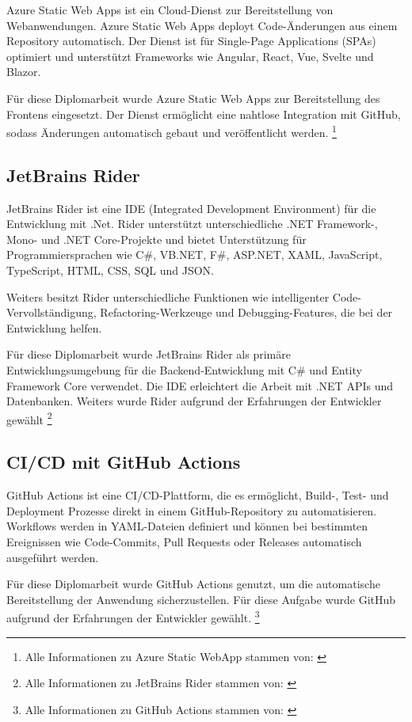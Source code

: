 Azure Static Web Apps ist ein Cloud-Dienst zur Bereitstellung von Webanwendungen. 
Azure Static Web Apps deployt Code-Änderungen aus einem Repository automatisch. Der Dienst 
ist für Single-Page Applications (SPAs) optimiert und unterstützt Frameworks wie Angular, 
React, Vue, Svelte und Blazor.

Für diese Diplomarbeit wurde Azure Static Web Apps zur Bereitstellung des Frontens 
eingesetzt. Der Dienst ermöglicht eine nahtlose Integration mit GitHub, sodass Änderungen 
automatisch gebaut und veröffentlicht werden.
\footnote{Alle Informationen zu Azure Static WebApp stammen von: \cite{MicrosoftCorporationz}}

\subsection{JetBrains Rider}
\label{subsection:jetbrains-rider}

JetBrains Rider ist eine IDE (Integrated Development Environment) für die Entwicklung mit .Net. 
Rider unterstützt unterschiedliche .NET Framework-, Mono- und .NET Core-Projekte und bietet 
Unterstützung für Programmiersprachen wie C\#, VB.NET, F\#, ASP.NET, XAML, JavaScript, 
TypeScript, HTML, CSS, SQL und JSON.

Weiters besitzt Rider unterschiedliche Funktionen wie intelligenter Code-Vervollständigung, 
Refactoring-Werkzeuge und Debugging-Features, die bei der Entwicklung helfen. 

Für diese Diplomarbeit wurde JetBrains Rider als primäre Entwicklungsumgebung für die 
Backend-Entwicklung mit C\# und Entity Framework Core verwendet. Die IDE erleichtert 
die Arbeit mit .NET APIs und Datenbanken. Weiters wurde Rider aufgrund der 
Erfahrungen der Entwickler gewählt
\footnote{Alle Informationen zu JetBrains Rider stammen von: \cite{JetBrains}}

\subsection{CI/CD mit GitHub Actions}

GitHub Actions ist eine CI/CD-Plattform, die es ermöglicht, Build-, Test- und 
Deployment Prozesse direkt in einem GitHub-Repository zu automatisieren. Workflows 
werden in YAML-Dateien definiert und können bei bestimmten Ereignissen wie 
Code-Commits, Pull Requests oder Releases automatisch ausgeführt werden.

Für diese Diplomarbeit wurde GitHub Actions genutzt, um die automatische Bereitstellung 
der Anwendung sicherzustellen. Für diese Aufgabe wurde GitHub aufgrund der Erfahrungen
der Entwickler gewählt.
\footnote{Alle Informationen zu GitHub Actions stammen von: \cite{GitHuba}}

